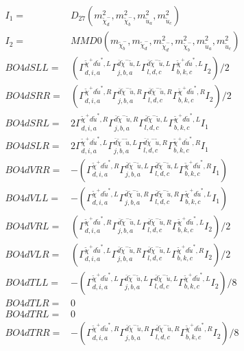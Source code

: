 \documentclass[A4,landscape]{article}
\begin{document}
\begin{align} 
I_1 = & D_{27}(m^2_{\tilde{\chi}^-_{{d}}}, m^2_{\tilde{\chi}^-_{{b}}}, m^2_{\tilde{u}_{{a}}}, m^2_{\tilde{u}_{{c}}}) \\ 
I_2 = & MMD0(m_{\tilde{\chi}^-_{{b}}}, m_{\tilde{\chi}^-_{{d}}}, m^2_{\tilde{\chi}^-_{{d}}}, m^2_{\tilde{\chi}^-_{{b}}}, m^2_{\tilde{u}_{{a}}}, m^2_{\tilde{u}_{{c}}}) \\ 
  BO4dSLL= & ( \Gamma^{\tilde{\chi}^+d \tilde{u}^*,L}_{d, i, a} \Gamma^{\bar{d}\tilde{\chi}^- \tilde{u} ,L}_{j, b, a} \Gamma^{\bar{d}\tilde{\chi}^- \tilde{u} ,L}_{l, d, c} \Gamma^{\tilde{\chi}^+d \tilde{u}^*,L}_{b, k, c} I_2)/2 \\ 
  BO4dSRR= & ( \Gamma^{\tilde{\chi}^+d \tilde{u}^*,R}_{d, i, a} \Gamma^{\bar{d}\tilde{\chi}^- \tilde{u} ,R}_{j, b, a} \Gamma^{\bar{d}\tilde{\chi}^- \tilde{u} ,R}_{l, d, c} \Gamma^{\tilde{\chi}^+d \tilde{u}^*,R}_{b, k, c} I_2)/2 \\ 
  BO4dSRL= & 2  \Gamma^{\tilde{\chi}^+d \tilde{u}^*,R}_{d, i, a} \Gamma^{\bar{d}\tilde{\chi}^- \tilde{u} ,R}_{j, b, a} \Gamma^{\bar{d}\tilde{\chi}^- \tilde{u} ,L}_{l, d, c} \Gamma^{\tilde{\chi}^+d \tilde{u}^*,L}_{b, k, c} I_1 \\ 
  BO4dSLR= & 2  \Gamma^{\tilde{\chi}^+d \tilde{u}^*,L}_{d, i, a} \Gamma^{\bar{d}\tilde{\chi}^- \tilde{u} ,L}_{j, b, a} \Gamma^{\bar{d}\tilde{\chi}^- \tilde{u} ,R}_{l, d, c} \Gamma^{\tilde{\chi}^+d \tilde{u}^*,R}_{b, k, c} I_1 \\ 
  BO4dVRR= & -( \Gamma^{\tilde{\chi}^+d \tilde{u}^*,R}_{d, i, a} \Gamma^{\bar{d}\tilde{\chi}^- \tilde{u} ,L}_{j, b, a} \Gamma^{\bar{d}\tilde{\chi}^- \tilde{u} ,L}_{l, d, c} \Gamma^{\tilde{\chi}^+d \tilde{u}^*,R}_{b, k, c} I_1) \\ 
  BO4dVLL= & -( \Gamma^{\tilde{\chi}^+d \tilde{u}^*,L}_{d, i, a} \Gamma^{\bar{d}\tilde{\chi}^- \tilde{u} ,R}_{j, b, a} \Gamma^{\bar{d}\tilde{\chi}^- \tilde{u} ,R}_{l, d, c} \Gamma^{\tilde{\chi}^+d \tilde{u}^*,L}_{b, k, c} I_1) \\ 
  BO4dVRL= & ( \Gamma^{\tilde{\chi}^+d \tilde{u}^*,R}_{d, i, a} \Gamma^{\bar{d}\tilde{\chi}^- \tilde{u} ,L}_{j, b, a} \Gamma^{\bar{d}\tilde{\chi}^- \tilde{u} ,R}_{l, d, c} \Gamma^{\tilde{\chi}^+d \tilde{u}^*,L}_{b, k, c} I_2)/2 \\ 
  BO4dVLR= & ( \Gamma^{\tilde{\chi}^+d \tilde{u}^*,L}_{d, i, a} \Gamma^{\bar{d}\tilde{\chi}^- \tilde{u} ,R}_{j, b, a} \Gamma^{\bar{d}\tilde{\chi}^- \tilde{u} ,L}_{l, d, c} \Gamma^{\tilde{\chi}^+d \tilde{u}^*,R}_{b, k, c} I_2)/2 \\ 
  BO4dTLL= & -( \Gamma^{\tilde{\chi}^+d \tilde{u}^*,L}_{d, i, a} \Gamma^{\bar{d}\tilde{\chi}^- \tilde{u} ,L}_{j, b, a} \Gamma^{\bar{d}\tilde{\chi}^- \tilde{u} ,L}_{l, d, c} \Gamma^{\tilde{\chi}^+d \tilde{u}^*,L}_{b, k, c} I_2)/8 \\ 
  BO4dTLR= & 0 \\ 
  BO4dTRL= & 0 \\ 
  BO4dTRR= & -( \Gamma^{\tilde{\chi}^+d \tilde{u}^*,R}_{d, i, a} \Gamma^{\bar{d}\tilde{\chi}^- \tilde{u} ,R}_{j, b, a} \Gamma^{\bar{d}\tilde{\chi}^- \tilde{u} ,R}_{l, d, c} \Gamma^{\tilde{\chi}^+d \tilde{u}^*,R}_{b, k, c} I_2)/8 \\ 
\end{align} 
\end{document}
